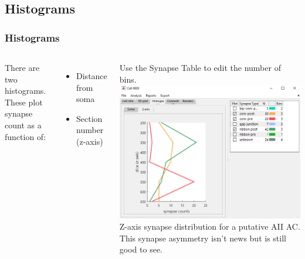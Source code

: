 \documentclass[11pt]{beamer}
\begin{document}
\subsection{Histograms}
\begin{frame}
	\frametitle{Histograms}
	\begin{columns}
			There are two histograms. These plot synapse count as a function of:
			\begin{itemize}
				\item Distance from soma
				\item Section number (z-axis)
			\end{itemize}
		Use the Synapse Table to edit the number of bins.
			\includegraphics[width=\textwidth]{c6800_histZ}
		\vskip3pt
		Z-axis synapse distribution for a putative AII AC. This synapse asymmetry isn't news but is still good to see.
	\end{columns}
\end{frame}
\end{document}
